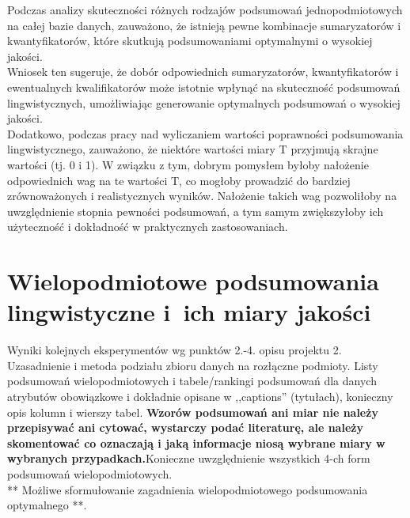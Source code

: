 \documentclass{article}
\begin{document}
\noindent Podczas analizy skuteczności różnych rodzajów podsumowań jednopodmiotowych na całej bazie danych, zauważono, że istnieją pewne kombinacje sumaryzatorów i kwantyfikatorów, które skutkują podsumowaniami optymalnymi o wysokiej jakości. \\

\noindent Wniosek ten sugeruje, że dobór odpowiednich sumaryzatorów, kwantyfikatorów i ewentualnych kwalifikatorów może istotnie wpłynąć na skuteczność podsumowań lingwistycznych, umożliwiając generowanie optymalnych podsumowań o wysokiej jakości. \\

\noindent Dodatkowo, podczas pracy nad wyliczaniem wartości poprawności podsumowania lingwistycznego, zauważono, że niektóre wartości miary T przyjmują skrajne wartości (tj. 0 i 1). W związku z tym, dobrym pomysłem byłoby nałożenie odpowiednich wag na te wartości T, co mogłoby prowadzić do bardziej zrównoważonych i realistycznych wyników. Nałożenie takich wag pozwoliłoby na uwzględnienie stopnia pewności podsumowań, a tym samym zwiększyłoby ich użyteczność i dokładność w praktycznych zastosowaniach.
















\section{Wielopodmiotowe podsumowania lingwistyczne i~ich miary jakości}
Wyniki kolejnych eksperymentów wg punktów 2.-4. opisu projektu 2. Uzasadnienie i
metoda podziału zbioru danych na rozłączne podmioty. Listy podsumowań
wielopodmiotowych i tabele/rankingi podsumowań dla danych atrybutów obowiązkowe i
dokładnie opisane w ,,captions'' (tytułach), konieczny opis kolumn i wierszy tabel.
{\bf Wzorów podsumowań ani miar nie należy przepisywać ani cytować, wystarczy podać literaturę, ale
należy skomentować co oznaczają i jaką informacje niosą wybrane miary w wybranych
przypadkach.}Konieczne uwzględnienie wszystkich 4-ch form podsumowań wielopodmiotowych.
\\

** Możliwe sformułowanie zagadnienia wielopodmiotowego podsumowania optymalnego **.\\
\\
\end{document}
